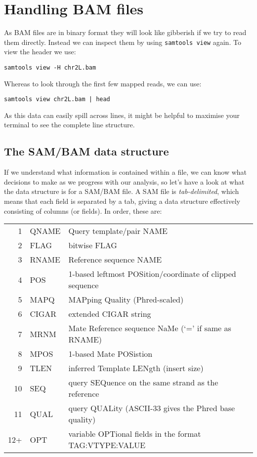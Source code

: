 \section{Handling BAM files}
\begin{steps}
As BAM files are in binary format they will look like gibberish if we try to read them directly.
Instead we can inspect them by using \texttt{samtools view} again.
To view the header we use:\\
\begin{lstlisting}
samtools view -H chr2L.bam
\end{lstlisting}
Whereas to look through the first few mapped reads, we can use:
\begin{lstlisting}
samtools view chr2L.bam | head
\end{lstlisting}
As this data can easily spill across lines, it might be helpful to maximise your terminal to see the complete line structure.
\end{steps}

\subsection{The SAM/BAM data structure}
\begin{information}
If we understand what information is contained within a file, we can know what decisions to make as we progress with our analysis, so let's have a look at what the data structure is for a SAM/BAM file.
A SAM file is \textit{tab-delimited}, which means that each field is separated by a tab, giving a data structure effectively consisting of columns (or fields).
In order, these are: \\
\begin{tabular}{r l l}
1 & QNAME & Query template/pair NAME \\
2 & FLAG & bitwise FLAG \\
3 & RNAME & Reference sequence NAME \\
4 & POS & 1-based leftmost POSition/coordinate of clipped sequence \\
5 & MAPQ & MAPping Quality (Phred-scaled) \\
6 & CIGAR & extended CIGAR string \\
7 & MRNM & Mate Reference sequence NaMe (`=' if same as RNAME) \\
8 & MPOS & 1-based Mate POSistion \\
9 & TLEN & inferred Template LENgth (insert size) \\
10 & SEQ & query SEQuence on the same strand as the reference \\
11 & QUAL & query QUALity (ASCII-33 gives the Phred base quality) \\
12+ & OPT & variable OPTional fields in the format TAG:VTYPE:VALUE \\
\end{tabular}
\end{information}

